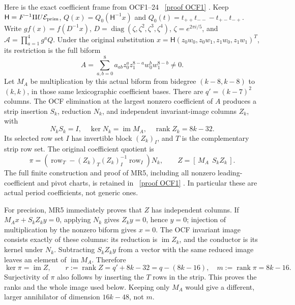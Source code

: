 \documentclass[11pt]{article}
\begin{document}
Here is the exact coefficient frame from OCF1--24 \cite{OCF}%
~\href{https://github.com/KokunoYumeto/zeta-function-research-reader/blob/5992ad50c0f2a06921f1fcaded7b4e38097c0739/workbenches/splitzero-tandem/continuations/20260920-original-kernel-mixed-determinants/providers/ORIGINAL_CONDUCTOR_STRIP_FRAME.tex\#L27}{[proof OCF1]}%
{}.
Keep $\mathsf H=F^{-1}\Pi U\mathcal E_{\rm prim}$,
$Q(x)=Q_0(\mathsf H^{-1}x)$ and
$Q_0(t)=t_{++}t_{--}-t_{+-}t_{-+}$.
Write $g f(x)=f(D^{-1}x)$,
$D=\operatorname{diag}(\zeta,\zeta^2,\zeta^3,\zeta^4)$,
$\zeta=e^{2\pi i/5}$, and $\mathcal A=\prod_{a=1}^4g^aQ$.
Under the original substitution
$x=\mathsf H(z_0w_0,z_0w_1,z_1w_0,z_1w_1)^T$, its restriction is the
full biform
\[
 A=\sum_{a,b=0}^8a_{ab}z_0^az_1^{8-a}w_0^bw_1^{8-b}\ne0.
 \tag{MR4}
\]
Let $M_A$ be multiplication by this actual biform from bidegree
$(k-8,k-8)$ to $(k,k)$, in those same lexicographic coefficient bases.
There are $q'=(k-7)^2$ columns. The OCF elimination at the largest
nonzero coefficient of $A$ produces a strip insertion $S_k$, reduction
$N_k$, and independent invariant-image columns $Z_k$, with
\[
 N_kS_k=I,\quad \ker N_k=\operatorname{im}M_A,\quad
 \operatorname{rank}Z_k=8k-32.\tag{MR5}
\]
Its selected row set $I$ has invertible block $(Z_k)_I$, and $T$ is
the complementary strip row set. The original coefficient quotient is
\[
 \pi=(\operatorname{row}_T-(Z_k)_T(Z_k)_I^{-1}
                   \operatorname{row}_I)N_k,
 \qquad Z=[\,M_A\ \ S_kZ_k\,].\tag{MR6}
\]
The full finite construction and proof of MR5, including all nonzero
leading-coefficient and pivot charts, is retained in \cite{OCF}%
~\href{https://github.com/KokunoYumeto/zeta-function-research-reader/blob/5992ad50c0f2a06921f1fcaded7b4e38097c0739/workbenches/splitzero-tandem/continuations/20260920-original-kernel-mixed-determinants/providers/ORIGINAL_CONDUCTOR_STRIP_FRAME.tex\#L27}{[proof OCF1]}%
{}.
In particular these are actual period coefficients, not generic ones.

For precision, MR5 immediately proves that $Z$ has independent columns.
If $M_Ax+S_kZ_ky=0$, applying $N_k$ gives $Z_ky=0$, hence $y=0$;
injection of multiplication by the nonzero biform gives $x=0$.
The OCF invariant image consists exactly of these columns: its reduction
is $\operatorname{im}Z_k$, and the conductor is its kernel under $N_k$.
Subtracting $S_kZ_ky$ from a vector with the same reduced image leaves
an element of $\operatorname{im}M_A$. Therefore
\[
 \ker\pi=\operatorname{im}Z,\qquad
 r:=\operatorname{rank}Z=q'+8k-32=q-(8k-16),
 \quad m:=\operatorname{rank}\pi=8k-16.\tag{MR7}
\]
Surjectivity of $\pi$ also follows by inserting the $T$ rows in the
strip. This proves the ranks and the whole image used below. Keeping
only $M_A$ would give a different, larger annihilator of dimension
$16k-48$, not $m$.
\end{document}
